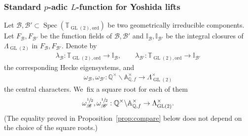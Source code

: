 \documentclass[JEP,XML,SOM,Unicode,published]{cedram}
\newcommand{\Lfunction}{$L$\nobreakdash-func\-tion\xspace}
\theoremstyle{plain}
\theoremstyle{remark}
\newcommand{\bA}{\mathbb{A}}
\newcommand{\bI}{\mathbb{I}}
\newcommand{\bQ}{\mathbb{Q}}
\newcommand{\bT}{\mathbb{T}}
\newcommand{\sB}{\mathscr{B}}
\DeclareMathOperator{\GL}{GL}
\newcommand{\ord}{\mathrm{ord}}
\DeclareMathOperator{\Spec}{Spec}
\begin{document}
\subsubsection{Standard \texorpdfstring{$p$-adic \protect\Lfunction}{pL} for Yoshida lifts}

Let $\sB,\sB'\subset \Spec(\bT_{\GL(2),\ord})$ be two geometrically irreducible components. Let $F_{\sB},F_{\sB'}$ be the function fields of $\sB,\sB'$ and $\bI_{\sB},\bI_{\sB'}$ be the integral closures of $\Lambda_{\GL(2)}$ in $F_{\sB},F_{\sB'}$. Denote by
\begin{align*}
\lambda_{\sB}:\bT_{\GL(2),\ord}\to \bI_{\sB},
\qquad\lambda_{\sB'}:\bT_{\GL(2),\ord}\to \bI_{\sB'}
\end{align*}
the corresponding Hecke eigensystems, and
\begin{align*}
\omega_{\sB},\omega_{\sB'}:\bQ^\times\backslash\bA^\times_{\bQ,f}\to \Lambda^\times_{\GL(2)}
\end{align*}
the central characters. We~fix a square root for each of them
\[
\omega^{\sfrac{1}{2}}_{\sB},\omega^{\sfrac{1}{2}}_{\sB'}:\bQ^\times\backslash\bA^\times_{\bQ,f}\to \Lambda^\times_{\GL(2)}.
\]
(The equality proved in Proposition~\ref{prop:compare} below does not depend on the choice of the square roots.)
\end{document}
